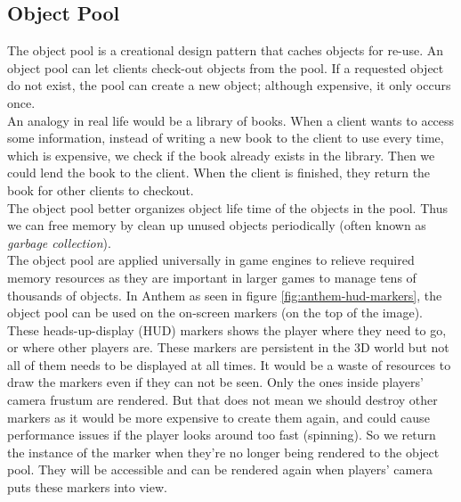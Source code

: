 \iftwocolumns
\begin{multicols}{2}
\fi

\subsection{Object Pool}
The object pool is a creational design pattern that caches objects for re-use. An object pool can let clients check-out objects from the pool. If a requested object do not exist, the pool can create a new object; although expensive, it only occurs once.\bs
\\
An analogy in real life would be a library of books. When a client wants to access some information, instead of writing a new book to the client to use every time, which is expensive, we check if the book already exists in the library. Then we could lend the book to the client. When the client is finished, they return the book for other clients to checkout.\bs
\\
The object pool better organizes object life time of the objects in the pool. Thus we can free memory by clean up unused objects periodically (often known as \textit{garbage collection}).\bs
\\


The object pool are applied universally in game engines to relieve required memory resources as they are important in larger games to manage tens of thousands of objects. In Anthem as seen in figure \ref{fig:anthem-hud-markers}, the object pool can be used on the on-screen markers (on the top of the image). These heads-up-display (HUD) markers shows the player where they need to go, or where other players are. These markers are persistent in the 3D world but not all of them needs to be displayed at all times. It would be a waste of resources to draw the markers even if they can not be seen. 
Only the ones inside players' camera frustum are rendered. But that does not mean we should destroy other markers as it would be more expensive to create them again, and could cause performance issues if the player looks around too fast (spinning). 
So we return the instance of the marker when they're no longer being rendered to the object pool. They will be accessible and can be rendered again when players' camera puts these markers into view.


\end{multicols}
